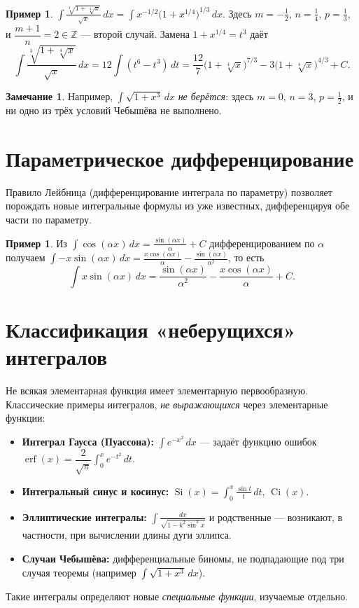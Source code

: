 \documentclass[11pt,a4paper]{article}
\theoremstyle{definition}
\newtheorem{example}[definition]{Пример}
\newtheorem{remark}[definition]{Замечание}
\theoremstyle{plain}
\newcommand{\Z}{\mathbb{Z}}
\newcommand{\dx}{\,dx}
\newcommand{\dt}{\,dt}
\begin{document}
\begin{example}
$\displaystyle\int\frac{\sqrt[3]{1+\sqrt[4]{x}}}{\sqrt{x}}\dx=\int x^{-1/2}\bigl(1+x^{1/4}\bigr)^{1/3}\dx$.
Здесь $m=-\tfrac12$, $n=\tfrac14$, $p=\tfrac13$, и $\dfrac{m+1}{n}=2\in\Z$ — второй случай. Замена
$1+x^{1/4}=t^3$ даёт
\[
  \int\frac{\sqrt[3]{1+\sqrt[4]{x}}}{\sqrt{x}}\dx
   =12\int(t^6-t^3)\dt=\frac{12}{7}\bigl(1+\sqrt[4]{x}\bigr)^{7/3}-3\bigl(1+\sqrt[4]{x}\bigr)^{4/3}+C.
\]
\end{example}

\begin{remark}
Например, $\displaystyle\int\sqrt{1+x^3}\dx$ \emph{не берётся}: здесь $m=0$, $n=3$, $p=\tfrac12$, и
ни одно из трёх условий Чебышёва не выполнено.
\end{remark}

\section{Параметрическое дифференцирование}

Правило Лейбница (дифференцирование интеграла по параметру) позволяет порождать новые интегральные
формулы из уже известных, дифференцируя обе части по параметру.

\begin{example}
Из $\displaystyle\int\cos(\alpha x)\dx=\frac{\sin(\alpha x)}{\alpha}+C$ дифференцированием по
$\alpha$ получаем $\displaystyle\int -x\sin(\alpha x)\dx=\frac{x\cos(\alpha x)}{\alpha}
-\frac{\sin(\alpha x)}{\alpha^2}$, то есть
\[
  \int x\sin(\alpha x)\dx=\frac{\sin(\alpha x)}{\alpha^2}-\frac{x\cos(\alpha x)}{\alpha}+C.
\]
\end{example}

\section{Классификация «неберущихся» интегралов}

Не всякая элементарная функция имеет элементарную первообразную. Классические примеры
интегралов, \emph{не выражающихся} через элементарные функции:
\begin{itemize}[leftmargin=*]
  \item \textbf{Интеграл Гаусса (Пуассона):} $\displaystyle\int e^{-x^2}\dx$ — задаёт функцию
        ошибок $\operatorname{erf}(x)=\dfrac{2}{\sqrt\pi}\displaystyle\int_0^x e^{-t^2}\dt$.
  \item \textbf{Интегральный синус и косинус:} $\displaystyle\operatorname{Si}(x)=\int_0^x\frac{\sin t}{t}\dt$,
        $\displaystyle\operatorname{Ci}(x)$.
  \item \textbf{Эллиптические интегралы:} $\displaystyle\int\frac{dx}{\sqrt{1-k^2\sin^2 x}}$ и
        родственные — возникают, в частности, при вычислении длины дуги эллипса.
  \item \textbf{Случаи Чебышёва:} дифференциальные биномы, не подпадающие под три случая теоремы
        (например $\int\sqrt{1+x^3}\dx$).
\end{itemize}
Такие интегралы определяют новые \emph{специальные функции}, изучаемые отдельно.
\end{document}

